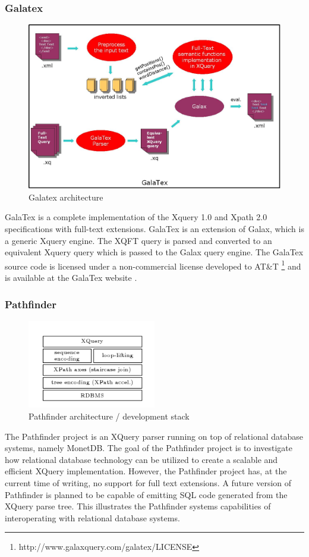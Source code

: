 \subsubsection{Galatex}
\begin{figure}[!h]
  \centering
    \includegraphics[width=1\textwidth]{img/galatex_architecture.png}
  \caption{Galatex architecture}
\end{figure}
GalaTex is a complete implementation of the Xquery 1.0 and Xpath 2.0
specifications with full-text extensions. GalaTex is an extension of Galax,
which is a generic Xquery engine. The XQFT query is parsed and converted to an
equivalent Xquery query which is passed to the Galax query engine. The GalaTex
source code is licensed under a non-commercial license developed to AT\&{}T 
\footnote{http://www.galaxquery.com/galatex/LICENSE} and is available at the
GalaTex website \cite{galatex}.

\subsubsection{Pathfinder}
\begin{figure}[!h]
  \centering
    \includegraphics[width=0.5\textwidth]{img/pathfinder_architecture.png}
  \caption{Pathfinder architecture / development stack}
\end{figure}
The Pathfinder project is an XQuery parser running on top of relational database systems, namely MonetDB. The goal of the Pathfinder project is to investigate how relational database technology can be utilized to create a scalable and efficient XQuery implementation. However, the Pathfinder project has, at the current time of writing, no support for full text extensions. A future version of Pathfinder is planned to be capable of emitting SQL code generated from the XQuery parse tree. This illustrates the Pathfinder systems capabilities of interoperating with relational database systems.

